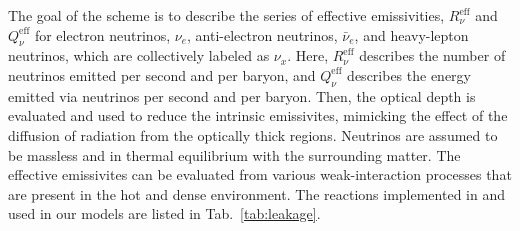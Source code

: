 %
The goal of the scheme is to describe the series of effective emissivities, 
$R_{\nu}^{\text{eff}}$ and $Q_{\nu}^{\text{eff}}$ for electron neutrinos, $\nu_e$, 
anti-electron neutrinos, $\bar{\nu}_e$, and heavy-lepton neutrinos, 
which are collectively labeled as $\nu_x$.
%
Here, $R_{\nu}^{\text{eff}}$ describes the number of neutrinos emitted per second and per baryon,
and $Q_{\nu}^{\text{eff}}$ describes the energy emitted via neutrinos per second and per baryon.
%
Then, the optical depth is evaluated and used to reduce the intrinsic emissivites, 
mimicking the effect of the diffusion of radiation from the optically thick regions.
%
%
Neutrinos are assumed to be massless and in thermal equilibrium with the surrounding matter.
%
%
The effective emissivites can be evaluated from various 
weak-interaction processes that are present in the hot and dense \pmerg{} environment. 
%
The reactions implemented in \wisky{} and used in our models are 
listed in Tab.~\ref{tab:leakage}. 
%

